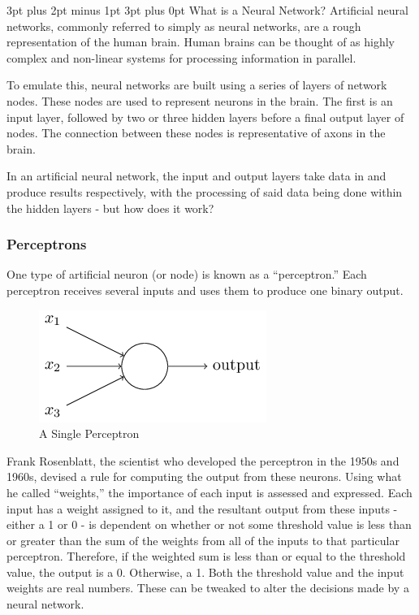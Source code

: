 \documentclass[12pt,a4paper]{article}
\makeatletter
\renewcommand\subsection{\@startsection {subsection}{1}{2mm} %
                               {3pt plus 2pt minus 1pt} %
                               {3pt plus 0pt} %
                               {\normalfont\bfseries}}
\makeatother
\begin{document}
\subsection{What is a Neural Network?}
Artificial neural networks, commonly referred to simply as neural networks, are a rough representation of the human brain. Human brains can be thought of as highly complex and non-linear systems for processing information in parallel\citep{NeuralNetworksAComprehensiveFoundation}. 

To emulate this, neural networks are built using a series of layers of network nodes. These nodes are used to represent neurons in the brain. The first is an input layer, followed by two or three hidden layers before a final output layer of nodes\citep{ArtificialNeuralNetwork}. The connection between these nodes is representative of axons in the brain. 

In an artificial neural network, the input and output layers take data in and produce results respectively, with the processing of said data being done within the hidden layers - but how does it work? 

\subsubsection{Perceptrons}
One type of artificial neuron (or node) is known as a \enquote{perceptron.} Each perceptron receives several inputs and uses them to produce one binary output\citep{NeuralNetworksAndDeepLearning}.  

\begin{figure}[h]
	\centering
	\includegraphics{Perceptron.png}
	\caption{A Single Perceptron}
\end{figure}

Frank Rosenblatt, the scientist who developed the perceptron in the 1950s and 1960s, devised a rule for computing the output from these neurons. Using what he called \enquote{weights,} the importance of each input is assessed and expressed. Each input has a weight assigned to it, and the resultant output from these inputs - either a 1 or 0 - is dependent on whether or not some threshold value is less than or greater than the sum of the weights from all of the inputs to that particular perceptron. Therefore, if the weighted sum is less than or equal to the threshold value, the output is a 0. Otherwise, a 1\citep{NeuralNetworksAndDeepLearning}. Both the threshold value and the input weights are real numbers. These can be tweaked to alter the decisions made by a neural network. 
\end{document}
